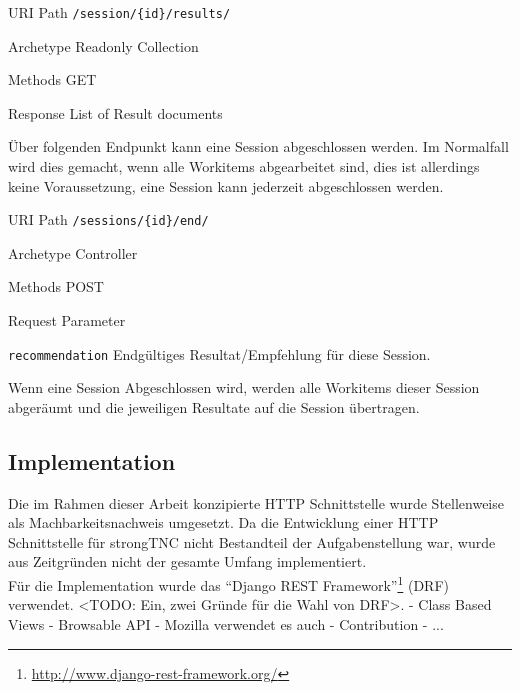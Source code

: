 \begin{mdframed}[style=def]
\begin{description*}
	\item[URI Path] \texttt{/session/\{id\}/results/}
	\item[Archetype] Readonly Collection
	\item[Methods] GET
	\item[Response] List of Result documents
\end{description*}
\end{mdframed}

Über folgenden Endpunkt kann eine Session abgeschlossen werden. Im Normalfall
wird dies gemacht, wenn alle Workitems abgearbeitet sind, dies ist allerdings
keine Voraussetzung, eine Session kann jederzeit abgeschlossen werden.

\begin{mdframed}[style=def]
\begin{description*}
	\item[URI Path] \texttt{/sessions/\{id\}/end/}
	\item[Archetype] Controller
	\item[Methods] POST
	\item[Request Parameter] \hfill
	\begin{description*}
		\item[\texttt{recommendation}] Endgültiges Resultat/Empfehlung für diese
		Session.
	\end{description*}
\end{description*}
\end{mdframed}

Wenn eine Session Abgeschlossen wird, werden alle Workitems dieser Session
abgeräumt und die jeweiligen Resultate auf die Session übertragen.

\subsection{Implementation}
Die im Rahmen dieser Arbeit konzipierte HTTP Schnittstelle wurde Stellenweise
als Machbarkeitsnachweis umgesetzt. Da die Entwicklung einer HTTP Schnittstelle
für strongTNC nicht Bestandteil der Aufgabenstellung war, wurde aus Zeitgründen
nicht der gesamte Umfang implementiert.\\
Für die Implementation wurde das \enquote{Django REST
Framework}\footnote{\url{http://www.django-rest-framework.org/}} (DRF)
verwendet. <TODO: Ein, zwei Gründe für die Wahl von DRF>.
- Class Based Views
- Browsable API
- Mozilla verwendet es auch
- Contribution
- ...

